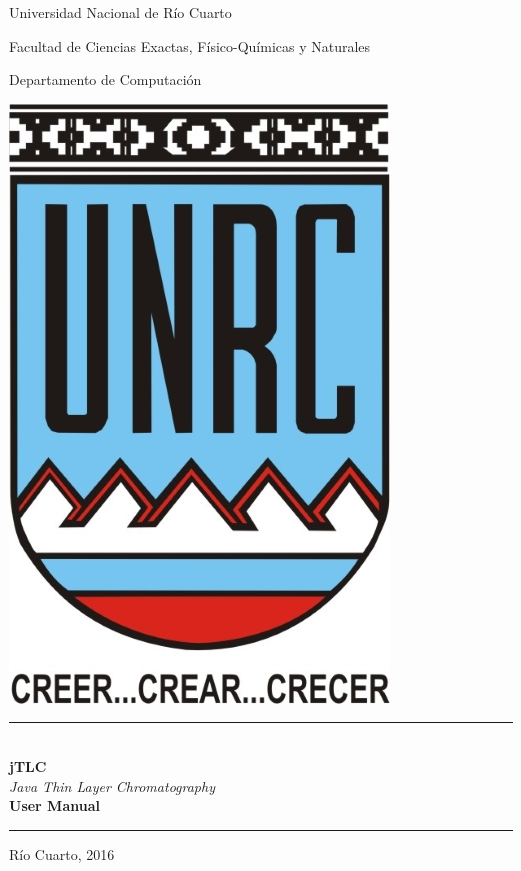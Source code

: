 \documentclass[12pt]{report}
\begin{document}
	\begin{titlepage}
		\begin{center}
			{\huge Universidad Nacional de R\'io Cuarto}\vspace{.2cm}
			
			{\large  Facultad de Ciencias Exactas, F\'isico-Qu\'imicas y Naturales}\vspace{.2cm}
			
			{\Large  Departamento de Computaci\'on}\vspace{.5cm}
			
			\includegraphics{imagenes/escudo}\vspace{1cm}
			
			\rule{13cm}{.01cm} \vspace{.5cm}\\
			{\LARGE \textbf{jTLC}}\\
			\vspace{.25cm}
			{\textit{\LARGE{Java Thin Layer Chromatography}}}\\
			\vspace{1cm}			
			{\large \textbf{User Manual}}
			\rule{13cm}{.01cm} \vspace{1cm}

			

			
			\vspace{4cm}			
			{\large R\'io Cuarto, 2016}
			\end{center}
	\end{titlepage}
	

\end{document}
